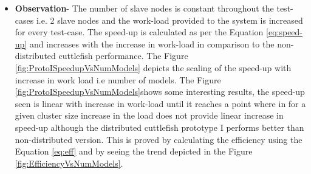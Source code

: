 \begin{enumerate}
\begin{itemize}
\item{\textbf{Observation}}- The number of slave nodes is constant throughout the test-cases i.e. 2 slave nodes and the work-load provided to the system is increased for every test-case. The speed-up is calculated as per the Equation \ref{eq:speed-up} and increases with the increase in work-load in comparison to the non-distributed cuttlefish performance. The Figure \ref{fig:ProtoISpeedupVsNumModels} depicts the scaling of the speed-up with increase in work load i.e number of models. The Figure \ref{fig:ProtoISpeedupVsNumModels}shows some interesting results, the speed-up seen is linear with increase in work-load until it reaches a point where in for a given cluster size increase in the load does not provide linear increase in speed-up although the distributed cuttlefish prototype I performs better than non-distributed version. This is proved by calculating the efficiency using the Equation \ref{eq:eff} and by seeing the trend depicted in the Figure \ref{fig:EfficiencyVsNumModels}. 
\end{itemize}


\end{enumerate}
